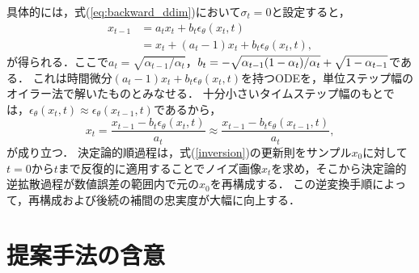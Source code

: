 \documentclass[MIRU,submit]{miru2026j}
\theoremstyle{definition}
\begin{document}
具体的には，式(\ref{eq:backward_ddim})において$\sigma_t=0$と設定すると，
\begin{equation}
    \label{ddim_update_abb}
    \begin{aligned}
        x_{t-1} & = a_t x_t + b_t \epsilon_\theta(x_t, t)       \\
                & = x_t+(a_t-1)x_t+b_t \epsilon_\theta(x_t, t),
    \end{aligned}
\end{equation}
が得られる．ここで$a_t=\sqrt{\alpha_{t-1}/\alpha_t}$，$b_t=-\sqrt{\alpha_{t-1}(1-\alpha_t)/\alpha_t}+\sqrt{\vphantom{/}1-\alpha_{t-1}}$である．
これは時間微分$(a_t-1)x_t+b_t \epsilon_\theta(x_t, t)$を持つODEを，単位ステップ幅のオイラー法で解いたものとみなせる．
十分小さいタイムステップ幅のもとでは，$\epsilon_\theta(x_{t},t)\approx\epsilon_\theta(x_{t-1},t)$であるから，
\begin{equation}
    \label{inversion}
    x_t = \frac{x_{t-1} - b_t \epsilon_\theta(x_t, t)}{a_t} \approx \frac{x_{t-1} - b_t \epsilon_\theta(x_{t-1}, t)}{a_t},
\end{equation}
が成り立つ．
決定論的順過程は，式(\ref{inversion})の更新則をサンプル$x_0$に対して$t=0$から$t$まで反復的に適用することでノイズ画像$x_t$を求め，そこから決定論的逆拡散過程が数値誤差の範囲内で元の$x_0$を再構成する．
この逆変換手順によって，再構成および後続の補間の忠実度が大幅に向上する．

\section{提案手法の含意}\label{appendix:proposition}
\end{document}
